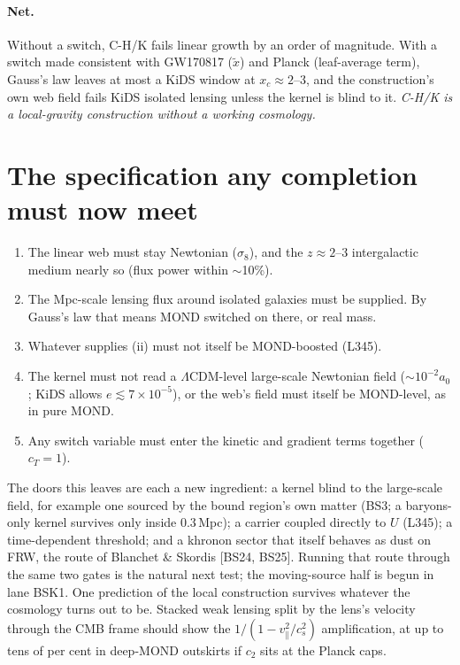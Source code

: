 \documentclass[10pt]{article}
\begin{document}
\paragraph{Net.}
Without a switch, C-H/K fails linear growth by an order of magnitude. With a switch made consistent with GW170817 ($\tilde x$) and Planck (leaf-average term), Gauss's law leaves at most a KiDS window at $x_c\approx2$--$3$, and the construction's own web field fails KiDS isolated lensing unless the kernel is blind to it. \emph{C-H/K is a local-gravity construction without a working cosmology.}

\section{The specification any completion must now meet}\label{sec:spec}
\begin{enumerate}[label=(\roman*)]
\item The linear web must stay Newtonian ($\sigma_8$), and the $z\approx2$--3 intergalactic medium nearly so (flux power within $\sim$10\%).
\item The Mpc-scale lensing flux around isolated galaxies must be supplied. By Gauss's law that means MOND switched on there, or real mass.
\item Whatever supplies (ii) must not itself be MOND-boosted (L345).
\item The kernel must not read a $\Lambda$CDM-level large-scale Newtonian field ($\sim\!10^{-2}a_0$; KiDS allows $e\lesssim7\times10^{-5}$), or the web's field must itself be MOND-level, as in pure MOND.
\item Any switch variable must enter the kinetic and gradient terms together ($c_T=1$).
\end{enumerate}
The doors this leaves are each a new ingredient: a kernel blind to the large-scale field, for example one sourced by the bound region's own matter (BS3; a baryons-only kernel survives only inside 0.3\,Mpc); a carrier coupled directly to $U$ (L345); a time-dependent threshold; and a khronon sector that itself behaves as dust on FRW, the route of Blanchet \& Skordis [BS24, BS25]. Running that route through the same two gates is the natural next test; the moving-source half is begun in lane BSK1.
One prediction of the local construction survives whatever the cosmology turns out to be. Stacked weak lensing split by the lens's velocity through the CMB frame should show the $1/(1-v_\parallel^2/c_s^2)$ amplification, at up to tens of per cent in deep-MOND outskirts if $c_2$ sits at the Planck caps.
\end{document}
